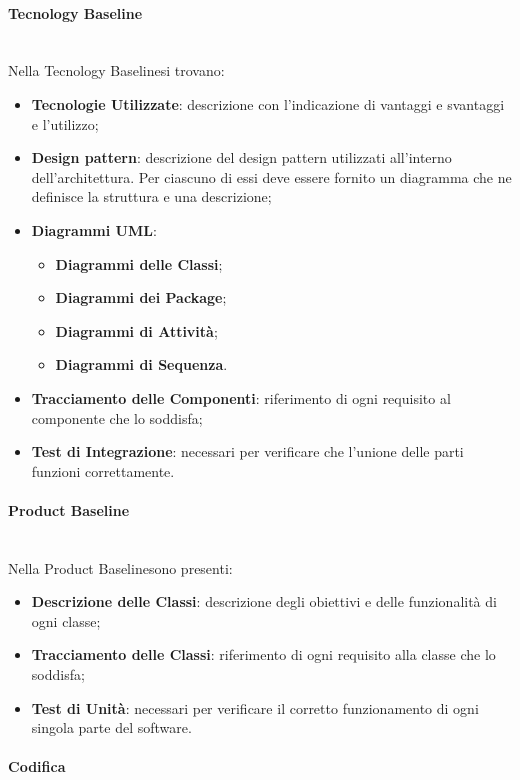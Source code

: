 \paragraph*{Tecnology Baseline}\mbox{}\\ [1mm]
Nella Tecnology Baseline\glosp si trovano:
\begin{itemize}
	\item \textbf{Tecnologie Utilizzate}: descrizione con l'indicazione di vantaggi e svantaggi e l'utilizzo;
	\item \textbf{Design pattern}: descrizione del design pattern utilizzati all'interno dell'architettura. Per ciascuno di essi deve essere fornito un diagramma che ne definisce la struttura e una descrizione;
	\item \textbf{Diagrammi UML}:
	\begin{itemize}
		\item \textbf{Diagrammi delle Classi};
		\item \textbf{Diagrammi dei Package};
		\item \textbf{Diagrammi di Attività};
		\item \textbf{Diagrammi di Sequenza}.
	\end{itemize}
	\item \textbf{Tracciamento delle Componenti}: riferimento di ogni requisito al componente che lo soddisfa;
	\item \textbf{Test di Integrazione}: necessari per verificare che l'unione delle parti funzioni correttamente.
\end{itemize}
\paragraph*{Product Baseline}\mbox{}\\ [1mm]
Nella Product Baseline\glosp sono presenti:
\begin{itemize}
	\item \textbf{Descrizione delle Classi}: descrizione degli obiettivi e delle funzionalità di ogni classe;
	\item \textbf{Tracciamento delle Classi}: riferimento di ogni requisito alla classe che lo soddisfa;
	\item \textbf{Test di Unità}: necessari per verificare il corretto funzionamento di ogni singola parte del software.
\end{itemize}
\paragraph{Codifica}
